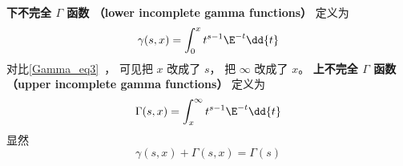 
\begin{issues}
\issueDraft
\end{issues}


\textbf{下不完全 $\Gamma$ 函数 （lower incomplete gamma functions）} 定义为
\begin{equation}
\gamma(s, x) = \int_0^x t^{s-1}\E^{-t} \dd{t}
\end{equation}
对比\autoref{Gamma_eq3}~， 可见把 $x$ 改成了 $s$， 把 $\infty$ 改成了 $x$。
\textbf{上不完全 $\Gamma$ 函数 （upper incomplete gamma functions）} 定义为
\begin{equation}
\Gamma(s, x) = \int_x^\infty t^{s-1}\E^{-t} \dd{t}
\end{equation}
显然
\begin{equation}
\gamma(s, x) + \Gamma(s, x) = \Gamma(s)
\end{equation}
